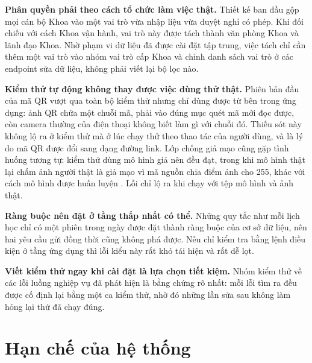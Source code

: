 \textbf{Phân quyền phải theo cách tổ chức làm việc thật.} Thiết kế ban đầu
gộp mọi cán bộ Khoa vào một vai trò vừa nhập liệu vừa duyệt nghỉ có phép. Khi
đối chiếu với cách Khoa vận hành, vai trò này được tách thành văn phòng Khoa
và lãnh đạo Khoa. Nhờ phạm vi dữ liệu đã được cài đặt tập trung, việc tách
chỉ cần thêm một vai trò vào nhóm vai trò cấp Khoa và chỉnh danh sách vai trò
ở các endpoint sửa dữ liệu, không phải viết lại bộ lọc nào.

\textbf{Kiểm thử tự động không thay được việc dùng thử thật.} Phiên bản đầu
của mã QR vượt qua toàn bộ kiểm thử nhưng chỉ dùng được từ bên trong ứng dụng:
ảnh QR chứa một chuỗi mã, phải vào đúng mục quét mã mới đọc được, còn camera
thường của điện thoại không biết làm gì với chuỗi đó. Thiếu sót này không lộ
ra ở kiểm thử mà ở lúc chạy thử theo thao tác của người dùng, và là lý do mã
QR được đổi sang dạng đường link. Lớp chống giả mạo cũng gặp tình huống tương
tự: kiểm thử dùng mô hình giả nên đều đạt, trong khi mô hình thật lại chấm ảnh
người thật là giả mạo vì mã nguồn chia điểm ảnh cho 255, khác với cách mô hình
được huấn luyện \cite{Minivision2020Silent}. Lỗi chỉ lộ ra khi chạy với tệp mô
hình và ảnh thật.

\textbf{Ràng buộc nên đặt ở tầng thấp nhất có thể.} Những quy tắc như mỗi lịch
học chỉ có một phiên trong ngày được đặt thành ràng buộc của cơ sở dữ liệu, nên
hai yêu cầu gửi đồng thời cũng không phá được. Nếu chỉ kiểm tra bằng lệnh điều
kiện ở tầng ứng dụng thì lỗi kiểu này rất khó tái hiện và rất dễ lọt.

\textbf{Viết kiểm thử ngay khi cài đặt là lựa chọn tiết kiệm.} Nhóm kiểm thử về
các lỗi luồng nghiệp vụ đã phát hiện là bằng chứng rõ nhất: mỗi lỗi tìm ra đều
được cố định lại bằng một ca kiểm thử, nhờ đó những lần sửa sau không làm hỏng
lại thứ đã chạy đúng.

\section{Hạn chế của hệ thống}

